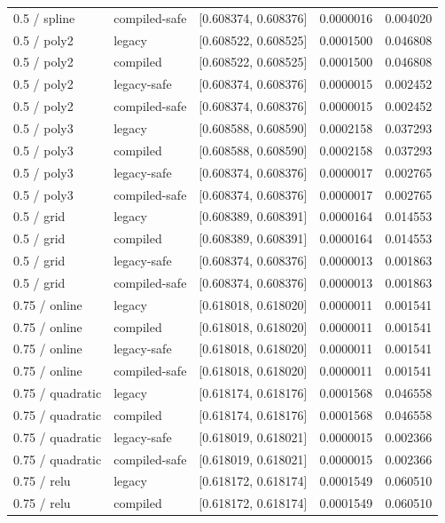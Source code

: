 \begin{longtable}{@{}lllrr@{}}
0.5 / spline & compiled-safe & [0.608374, 0.608376] & 0.0000016 & 0.004020\\
0.5 / poly2 & legacy & [0.608522, 0.608525] & 0.0001500 & 0.046808\\
0.5 / poly2 & compiled & [0.608522, 0.608525] & 0.0001500 & 0.046808\\
0.5 / poly2 & legacy-safe & [0.608374, 0.608376] & 0.0000015 & 0.002452\\
0.5 / poly2 & compiled-safe & [0.608374, 0.608376] & 0.0000015 & 0.002452\\
0.5 / poly3 & legacy & [0.608588, 0.608590] & 0.0002158 & 0.037293\\
0.5 / poly3 & compiled & [0.608588, 0.608590] & 0.0002158 & 0.037293\\
0.5 / poly3 & legacy-safe & [0.608374, 0.608376] & 0.0000017 & 0.002765\\
0.5 / poly3 & compiled-safe & [0.608374, 0.608376] & 0.0000017 & 0.002765\\
0.5 / grid & legacy & [0.608389, 0.608391] & 0.0000164 & 0.014553\\
0.5 / grid & compiled & [0.608389, 0.608391] & 0.0000164 & 0.014553\\
0.5 / grid & legacy-safe & [0.608374, 0.608376] & 0.0000013 & 0.001863\\
0.5 / grid & compiled-safe & [0.608374, 0.608376] & 0.0000013 & 0.001863\\
0.75 / online & legacy & [0.618018, 0.618020] & 0.0000011 & 0.001541\\
0.75 / online & compiled & [0.618018, 0.618020] & 0.0000011 & 0.001541\\
0.75 / online & legacy-safe & [0.618018, 0.618020] & 0.0000011 & 0.001541\\
0.75 / online & compiled-safe & [0.618018, 0.618020] & 0.0000011 & 0.001541\\
0.75 / quadratic & legacy & [0.618174, 0.618176] & 0.0001568 & 0.046558\\
0.75 / quadratic & compiled & [0.618174, 0.618176] & 0.0001568 & 0.046558\\
0.75 / quadratic & legacy-safe & [0.618019, 0.618021] & 0.0000015 & 0.002366\\
0.75 / quadratic & compiled-safe & [0.618019, 0.618021] & 0.0000015 & 0.002366\\
0.75 / relu & legacy & [0.618172, 0.618174] & 0.0001549 & 0.060510\\
0.75 / relu & compiled & [0.618172, 0.618174] & 0.0001549 & 0.060510\\

\end{longtable}
